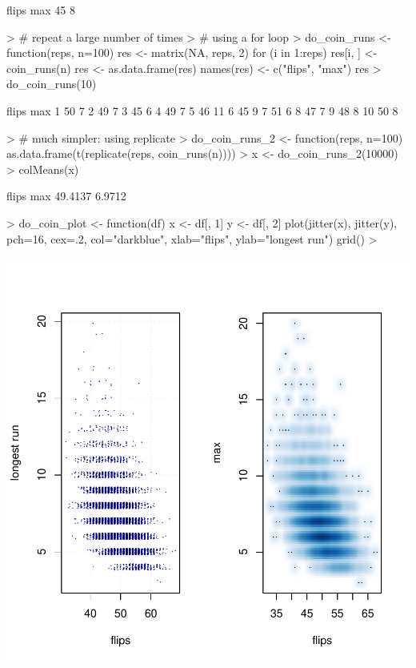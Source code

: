 \begin{Schunk}
\begin{Soutput}
flips   max 
   45     8 
\end{Soutput}
\begin{Sinput}
> # repeat a large number of times  
> # using a for loop
> do_coin_runs <- function(reps, n=100){
   res <- matrix(NA, reps, 2)
   for (i in 1:reps)
     res[i, ] <- coin_runs(n)
   res <- as.data.frame(res)
   names(res) <- c("flips", "max")
   res
 }
> do_coin_runs(10)  
\end{Sinput}
\begin{Soutput}
   flips max
1     50   7
2     49   7
3     45   6
4     49   7
5     46  11
6     45   9
7     51   6
8     47   7
9     48   8
10    50   8
\end{Soutput}
\begin{Sinput}
> # much simpler: using replicate  
> do_coin_runs_2 <- function(reps, n=100){
   as.data.frame(t(replicate(reps, coin_runs(n))))
 } 
> x <- do_coin_runs_2(10000) 
> colMeans(x)
\end{Sinput}
\begin{Soutput}
  flips     max 
49.4137  6.9712 
\end{Soutput}
\begin{Sinput}
> do_coin_plot <- function(df){ 
   x <- df[, 1]
   y <- df[, 2]
   plot(jitter(x), jitter(y), pch=16, cex=.2, col="darkblue", 
        xlab="flips", ylab="longest run") 
   grid()
 } 
> 
\end{Sinput}
\end{Schunk}

\includegraphics{sim_coinflips-003}

